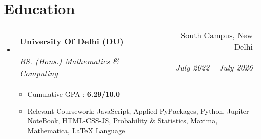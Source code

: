 \documentclass[letterpaper,11pt]{article}
\makeatletter
\newcommand{\resumeItem}[1]{
  \item\small{
    {#1 \vspace{-2pt}}
  }
}
\newcommand{\resumeSubheading}[4]{
  \vspace{-2pt}\item
    \begin{tabular*}{0.97\textwidth}[t]{l@{\extracolsep{\fill}}r}
      \textbf{#1} & #2 \\
      \textit{\small#3} & \textit{\small #4} \\
    \end{tabular*}\vspace{-7pt}
}
\newcommand{\resumeSubHeadingListStart}{\begin{itemize}[leftmargin=0.15in, label={}]}
\newcommand{\resumeSubHeadingListEnd}{\end{itemize}}
\newcommand{\resumeItemListStart}{\begin{itemize}}
\newcommand{\resumeItemListEnd}{\end{itemize}\vspace{-5pt}}
\makeatother
\begin{document}




\section{Education}
  \resumeSubHeadingListStart
    \resumeSubheading
      {University Of Delhi (DU)}{ South Campus, New Delhi}
      {BS. (Hons.) Mathematics \& Computing}{July 2022 -- July 2026}
      \resumeItemListStart
        \resumeItem{Cumulative GPA : \textbf{6.29/10.0}}
        \resumeItem{Relevant Coursework: JavaScript, Applied PyPackages, Python, Jupiter NoteBook, HTML-CSS-JS, Probability \& Statistics, Maxima, Mathematica, LaTeX Language}
      \resumeItemListEnd
  \resumeSubHeadingListEnd





\begin{comment}
    {\emph{Research Work} $|$ {Jan 2021 - July 2022}}
    {\emph{Natural Language Processing} $|$ {Feb 2021 - May 2021}}
\end{comment}

\end{document}
